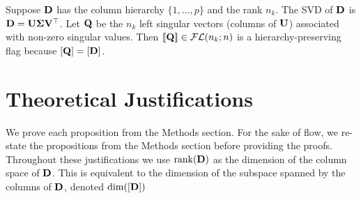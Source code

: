 \begin{exmp}[SVD]
    Suppose $\mathbf{D}$ has the column hierarchy $\{1,\dots,p\}$ and the rank $n_k$. The SVD of $\mathbf{D}$ is $\mathbf{D} =\mathbf{U} \bm{\Sigma} \mathbf{V}^\top$. Let $\mathbf{Q}$ be the $n_k$ left singular vectors (columns of $\mathbf{U}$) associated with non-zero singular values. Then $[\![\mathbf{Q}]\!] \in \mathcal{FL}(n_k;n)$ is a hierarchy-preserving flag because $[\mathbf{Q}] = [\mathbf{D}]$.
\end{exmp}


\section{Theoretical Justifications}\label{sec:proofs}
We prove each proposition from the Methods section. For the sake of flow, we re-state the propositions from the Methods section before providing the proofs. Throughout these justifications we use $\mathrm{rank}(\mathbf{D})$ as the dimension of the column space of $\mathbf{D}$. This is equivalent to the dimension of the subspace spanned by the columns of $\mathbf{D}$, denoted $\mathrm{dim}([\mathbf{D}])$

